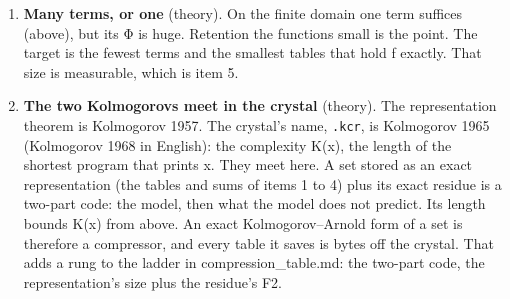 \begin{enumerate}
\item \textbf{Many terms, or one} (theory). On the finite domain one term suffices (above), but its Φ is huge. Retention the functions small is the point. The target is the fewest terms and the smallest tables that hold f exactly. That size is measurable, which is item 5.
\item \textbf{The two Kolmogorovs meet in the crystal} (theory). The representation theorem is Kolmogorov 1957. The crystal's name, \texttt{.\allowbreak{}kcr}, is Kolmogorov 1965~\cite{src:Kolmogorov-1965} (Kolmogorov 1968 in English): the complexity K(x), the length of the shortest program that prints x. They meet here. A set stored as an exact representation (the tables and sums of items 1 to 4) plus its exact residue is a two-part code: the model, then what the model does not predict. Its length bounds K(x) from above. An exact Kolmogorov–Arnold form of a set is therefore a compressor, and every table it saves is bytes off the crystal. That adds a rung to the ladder in compression\_\allowbreak{}table.md: the two-part code, the representation's size plus the residue's F2.
\end{enumerate}

